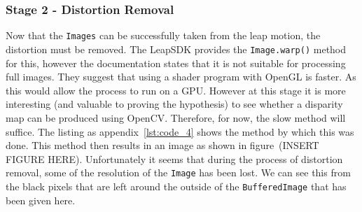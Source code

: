 \documentclass[11pt,oneside]{report}
\newcommand\code[1]{\texttt{#1}}
\begin{document}
		\subsubsection{Stage 2 - Distortion Removal}
		Now that the \code{Images} can be successfully taken from the leap motion, the distortion must be removed.
		The LeapSDK provides the \code{Image.warp()} method for this, however the documentation states that it is not suitable for processing full images.
		They suggest that using a shader program with OpenGL is faster.
		As this would allow the process to run on a GPU.
		However at this stage it is more interesting (and valuable to proving the hypothesis) to see whether a disparity map can be produced using OpenCV.
		Therefore, for now, the slow method will suffice.
		The listing as appendix~\ref{lst:code_4} shows the method by which this was done.
		This method then results in an image as shown in figure~(INSERT FIGURE HERE).
		Unfortunately it seems that during the process of distortion removal, some of the resolution of the \code{Image} has been lost.
		We can see this from the black pixels that are left around the outside of the \code{BufferedImage} that has been given here.
		
\end{document}
